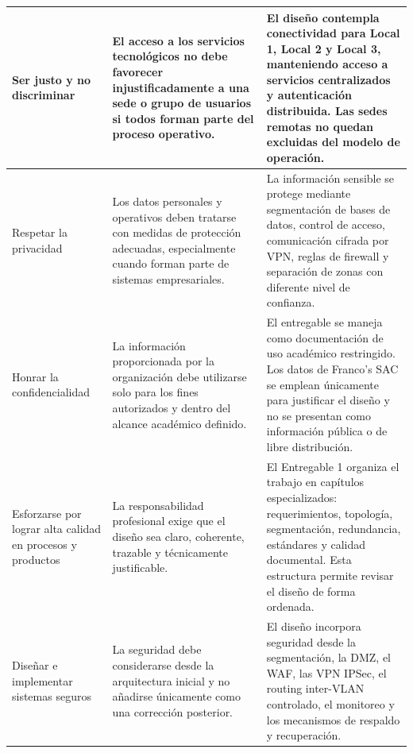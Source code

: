 \documentclass[11pt, a4paper, oneside]{report}
\begin{document}
\begin{xltabular}{\textwidth}{@{}|L{3.6cm}|X|X|@{}}
{\small Ser justo y no discriminar} &
{\small El acceso a los servicios tecnológicos no debe favorecer injustificadamente a una sede o grupo de usuarios si todos forman parte del proceso operativo.} &
{\small El diseño contempla conectividad para Local 1, Local 2 y Local 3, manteniendo acceso a servicios centralizados y autenticación distribuida. Las sedes remotas no quedan excluidas del modelo de operación.} \\ \hline

{\small Respetar la privacidad} &
{\small Los datos personales y operativos deben tratarse con medidas de protección adecuadas, especialmente cuando forman parte de sistemas empresariales.} &
{\small La información sensible se protege mediante segmentación de bases de datos, control de acceso, comunicación cifrada por VPN, reglas de firewall y separación de zonas con diferente nivel de confianza.} \\ \hline

{\small Honrar la confidencialidad} &
{\small La información proporcionada por la organización debe utilizarse solo para los fines autorizados y dentro del alcance académico definido.} &
{\small El entregable se maneja como documentación de uso académico restringido. Los datos de Franco's SAC se emplean únicamente para justificar el diseño y no se presentan como información pública o de libre distribución.} \\ \hline

{\small Esforzarse por lograr alta calidad en procesos y productos} &
{\small La responsabilidad profesional exige que el diseño sea claro, coherente, trazable y técnicamente justificable.} &
{\small El Entregable 1 organiza el trabajo en capítulos especializados: requerimientos, topología, segmentación, redundancia, estándares y calidad documental. Esta estructura permite revisar el diseño de forma ordenada.} \\ \hline

{\small Diseñar e implementar sistemas seguros} &
{\small La seguridad debe considerarse desde la arquitectura inicial y no añadirse únicamente como una corrección posterior.} &
{\small El diseño incorpora seguridad desde la segmentación, la DMZ, el WAF, las VPN IPSec, el routing inter-VLAN controlado, el monitoreo y los mecanismos de respaldo y recuperación.} \\ \hline

\end{xltabular}

\normalsize
\end{document}
